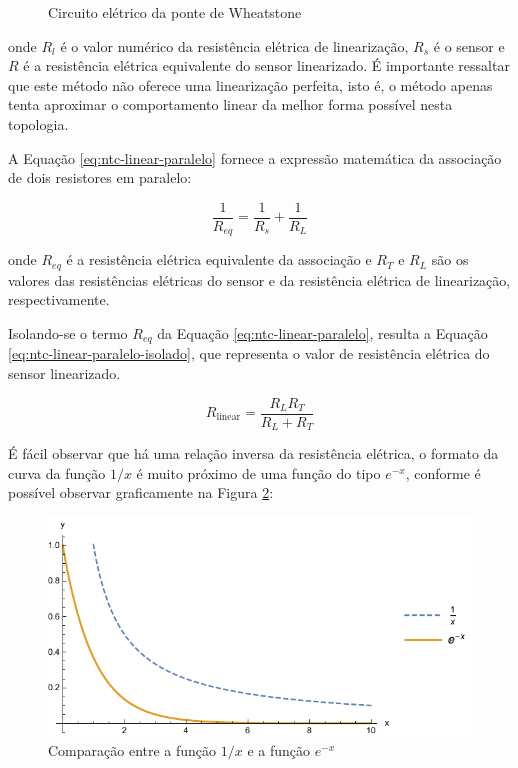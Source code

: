 \documentclass[a4paper]{instrumentacao}
\begin{document}
\begin{figure}[H]
\center
[circuito]
\caption{Circuito elétrico da ponte de Wheatstone}
\label{fig:ntc-linear}
\end{figure}

\noindent
onde $R_l$ é o valor numérico da resistência elétrica de linearização, $R_s$ é o sensor e $R$ é a resistência elétrica equivalente do sensor linearizado. É importante ressaltar que este método não oferece uma linearização perfeita, isto é, o método apenas tenta aproximar o comportamento linear da melhor forma possível nesta topologia.

A Equação \ref{eq:ntc-linear-paralelo} fornece a expressão matemática da associação de dois resistores em paralelo:

\begin{equation}
	\frac{1}{R_{eq}}=\frac{1}{R_s} + \frac{1}{R_L}
	\label{eq:ntc-linear-paralelo}
\end{equation}

\noindent
onde $R_{eq}$ é a resistência elétrica equivalente da associação e $R_T$ e $R_L$ são os valores das resistências elétricas do sensor e da resistência elétrica de linearização, respectivamente.

Isolando-se o termo $R_{eq}$ da Equação \ref{eq:ntc-linear-paralelo}, resulta a Equação \ref{eq:ntc-linear-paralelo-isolado}, que representa o valor de resistência elétrica do sensor linearizado.

\begin{equation}
	R_{\text{linear}} = \frac{R_L R_T}{R_L+R_T}
	\label{eq:ntc-linear-paralelo-isolado}
\end{equation}

É fácil observar que há uma relação inversa da resistência elétrica, o formato da curva da função $1/x$ é muito próximo de uma função do tipo $e^{-x}$, conforme é possível observar graficamente na Figura \ref{fig:ntc-linear-funcao-comparacao}:

\begin{figure}[H]
\center
\includegraphics[width=\textwidth]{X1-vs-Exponencial.pdf}
\caption{Comparação entre a função $1/x$ e a função $e^{-x}$}
\label{fig:ntc-linear-funcao-comparacao}
\end{figure}
\end{document}
